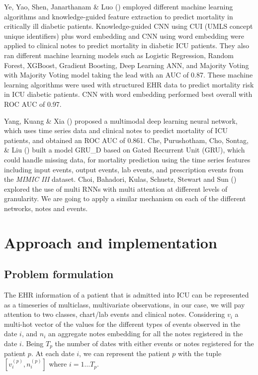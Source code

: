 \documentclass{sigkddExp}
\begin{document}
Ye, Yao, Shen, Janarthanam \& Luo (\cite{ye}) employed different machine learning algorithms and knowledge-guided 
feature extraction to predict mortality in critically ill diabetic patients. Knowledge-guided CNN using CUI 
(UMLS concept unique identifiers) plus word embedding and CNN using word embedding were applied to clinical notes 
to predict mortality in diabetic ICU patients. They also ran different machine learning models such as Logistic Regression,
 Random Forest, XGBoost, Gradient Boosting, Deep Learning ANN, and Majority Voting with Majority Voting model taking 
 the lead with an AUC of 0.87. These machine learning algorithms were used with structured EHR data to predict mortality 
 risk in ICU diabetic patients. CNN with word embedding performed best overall with ROC AUC of 0.97.

Yang, Kuang \& Xia (\cite{yang}) proposed a multimodal deep learning neural network,
 which uses time series data and clinical notes to predict mortality of ICU patients,
 and obtained an ROC AUC of 0.861. Che, Purushotham, Cho, Sontag, \& Liu (\cite{che}) built a 
 model \textsc{GRU\_D} based on Gated Recurrent Unit (GRU),
 which could handle missing data, for mortality prediction using the time series features including input events,
 output events, lab events, and prescription events from the \textit {MIMIC III} dataset.
Choi, Bahadori, Kulas, Schuetz, Stewart and Sun (\cite{choi}) explored the use of multi RNNs with multi attention at different
 levels of granularity. We are going to apply a similar mechanism on each of the different networks,
 notes and events.

\section {Approach and implementation}
\subsection{Problem formulation}
The EHR information of a patient that is admitted into ICU can be represented 
as a timeseries of multiclass, multivariate observations, in our case, we will
 pay attention to two classes, chart/lab events and clinical notes. Considering $\mathit{v_i}$ a multi-hot vector 
 of the values for the different types of events observed in the date $\mathit{i}$, and $\mathit {n_i}$ an aggregate 
 notes embedding for all the notes registered in the date $\mathit{i}$. Being $\mathit {T_p}$ the number of dates with either events or notes registered 
 for the patient $\mathit {p}$. 
 At each date $\mathit{i}$, we can represent the patient $\mathit{p}$ with the tuple $\mathit {[v_i^{(p)}, n_i^{(p)}]}$ where $\mathit {i = 1 \ldots T_p}$. 
   
\end{document}
